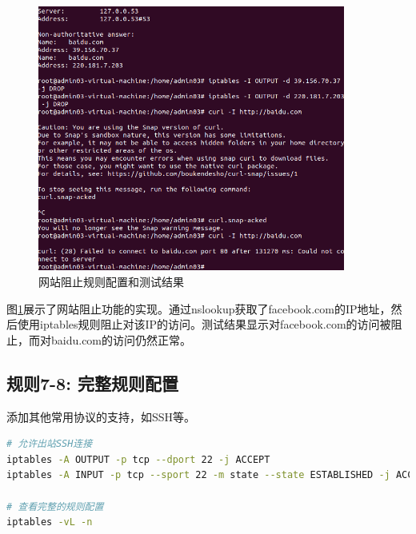 \documentclass[12pt,a4paper]{article}
\begin{document}
\begin{figure}[H]
    \centering
    \includegraphics[width=0.9\textwidth]{08_block_websit.png}
    \caption{网站阻止规则配置和测试结果}
    \label{fig:block_website}
\end{figure}

图\ref{fig:block_website}展示了网站阻止功能的实现。通过nslookup获取了facebook.com的IP地址，然后使用iptables规则阻止对该IP的访问。测试结果显示对facebook.com的访问被阻止，而对baidu.com的访问仍然正常。

\subsection{规则7-8: 完整规则配置}

添加其他常用协议的支持，如SSH等。

\begin{lstlisting}[language=bash, caption=添加其他协议支持]
# 允许出站SSH连接
iptables -A OUTPUT -p tcp --dport 22 -j ACCEPT
iptables -A INPUT -p tcp --sport 22 -m state --state ESTABLISHED -j ACCEPT

# 查看完整的规则配置
iptables -vL -n
\end{lstlisting}
\end{document}
